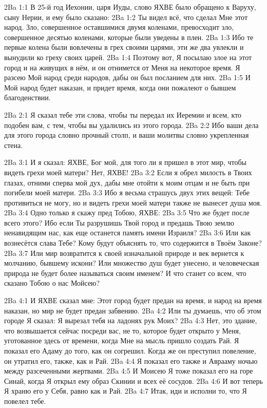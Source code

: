 \vs 2Ba 1:1
В 25-й год Иехонии, царя Иуды, слово ЯХВЕ было обращено к Варуху, сыну Нерии, и ему было сказано:
\vs 2Ba 1:2
Ты видел всё, что сделал Мне этот народ. Зло, совершенное оставшимися двумя коленами, превосходит зло, совершенное десятью коленами, которые были уведены в плен.
\vs 2Ba 1:3
Ибо те первые колена были вовлечены в грех своими царями, эти же два увлекли и вынудили ко греху своих царей.
\vs 2Ba 1:4
Поэтому вот, Я посылаю злое на этот город и на живущих в нём, и он отнимется от Меня на некоторое время. Я разсею Мой народ среди народов, дабы он был посланием для них.
\vs 2Ba 1:5
И Мой народ будет наказан, и придет время, когда они пожалеют о бывшем благоденствии.

\vs 2Ba 2:1
Я сказал тебе эти слова, чтобы ты передал их Иеремии и всем, кто подобен вам, с тем, чтобы вы удалились из этого города.
\vs 2Ba 2:2
Ибо ваши дела для этого города словно прочный столп, и ваши молитвы словно укрепленная стена.

\vs 2Ba 3:1
И я сказал: ЯХВЕ, Бог мой, для того ли я пришел в этот мир, чтобы видеть грехи моей матери? Нет, ЯХВЕ!
\vs 2Ba 3:2
Если я обрел милость в Твоих глазах, отними сперва мой дух, дабы мне отойти к моим отцам и не быть при погибели моей матери.
\vs 2Ba 3:3
Ибо я весьма страшусь двух этих вещей: Тебе противиться не могу, но и видеть грехи моей матери также не вынесет душа моя.
\vs 2Ba 3:4
Одно только я скажу пред Тобою, ЯХВЕ:
\vs 2Ba 3:5
Что же будет после всего этого? Ибо если Ты разрушишь Твой город и предашь Твою землю ненавидящим нас, как еще останется память имени Израиля?
\vs 2Ba 3:6
Или как вознесётся слава Тебе? Кому будут объяснять то, что содержится в Твоём Законе?
\vs 2Ba 3:7
Или мир возвратится к своей изначальной природе и век вернется к молчанию, бывшему искони? Или множество душ будет унесено, и человеческая природа не будет более называться своим именем? И что станет со всем, что сказано Тобою о нас Мойсею?

\vs 2Ba 4:1
И ЯХВЕ сказал мне: Этот город будет предан на время, и народ на время наказан, но мир не будет предан забвению.
\vs 2Ba 4:2
Или ты думаешь, что об этом городе Я сказал: Я вырезал тебя на ладонях рук Моих?
\vs 2Ba 4:3
Нет, это здание, что возвышается сейчас посреди вас, не то, которое будет открыто у Меня, уготованное здесь от времени, когда Мне на мысль пришло создать Рай. Я показал его Адаму до того, как он согрешил. Когда же он преступил повеление, он утратил его, также, как и Рай.
\vs 2Ba 4:4
Я показал его также и Аврааму ночью между разсеченными жертвами.
\vs 2Ba 4:5
И Моисею Я тоже показал его на горе Синай, когда Я открыл ему образ Скинии и всех её сосудов.
\vs 2Ba 4:6
И вот теперь Я храню его у Себя, равно как и Рай.
\vs 2Ba 4:7
Итак, иди и исполни то, что Я повелел тебе.


